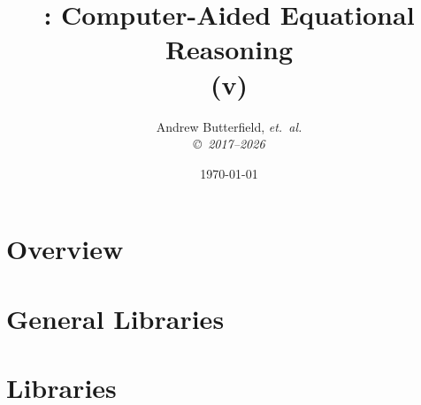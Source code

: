 \documentclass[fleqn,10pt]{report}
\author{
Andrew Butterfield, \it{et.\ al.}
\\
{\small \copyright\ 2017--2026}
}
\title{
  \reasonEq: Computer-Aided Equational Reasoning
  \\(v\reqVersion)
}
\date{
\today
}
\begin{document}
\maketitle
\setcounter{tocdepth}{2}
\tableofcontents

\part{Overview}






% 

% 

\part{General Libraries}

\newpage

\part{Libraries}
\end{document}
